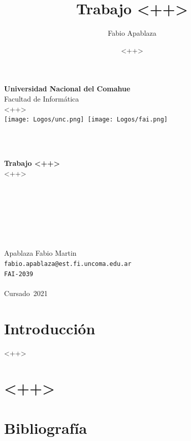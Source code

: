 \documentclass{article}
\title{Trabajo <++>}
\author{Fabio Apablaza}
\begin{document}
\titlepage
\date{<++>} %
\Large
\begin{center}


\vspace{0.7cm}
{\LARGE {\bf Universidad Nacional del Comahue}}\\
{\Large { Facultad de Informática}}\\
{\large {<++>}}\\%

\vspace{-3cm}
\mbox{\hspace{-3.5cm}\texttt{[image: Logos/unc.png]}\hspace{14cm}
\texttt{[image: Logos/fai.png]}}



\vspace{2cm}



\ \\
{

	\ \\
	\textbf{Trabajo <++>}\\
	<++>	%
	\ \\

\ \\
\ \\

\ \\

\ \\

\ \\

\ \\

\ \\
\vfill
{\Large Apablaza Fabio Martin
\ \\
\texttt{fabio.apablaza@est.fi.uncoma.edu.ar}
\ \\
\texttt{FAI-2039}
}
\ \\
\ \\
{\LARGE Cursado\ 2021}
\ \\
}
\end{center}
\normalsize
\newpage
\tableofcontents

\newpage
\section{Introducción}
<++>

\section{<++>}
\newpage
\section{Bibliografía}


\end{document}

